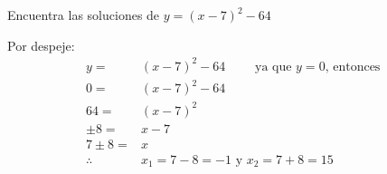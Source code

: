 Encuentra las soluciones de $y=(x-7)^2-64$

\begin{solutionbox}{5cm}
    Por despeje:
    \begin{align*}
        y=         & (x-7)^2-64  \qquad \text{ ya que $y=0$, entonces } \\
        0=         & (x-7)^2-64                                         \\
        64=        & (x-7)^2                                            \\
        \pm 8=     & x-7                                                \\
        7 \pm 8=   & x                                                  \\
        \therefore & x_1=7-8 =-1 \text{ y } x_2=7+8=15
    \end{align*}
\end{solutionbox}
